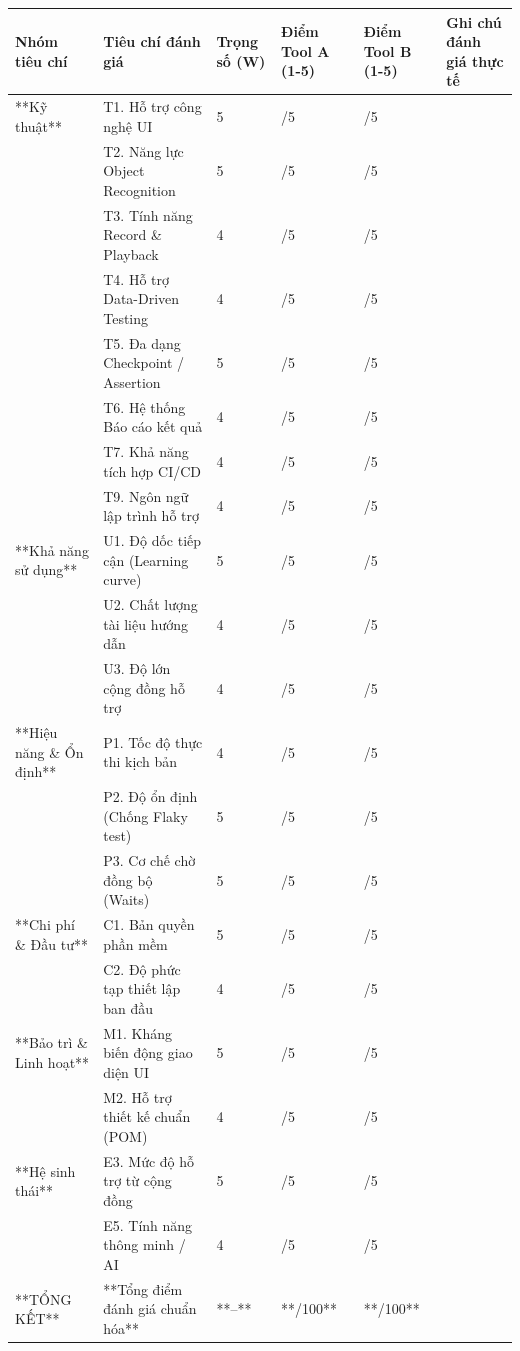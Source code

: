 \begin{table}[H]
\centering
\begin{tabular}{|l|l|l|l|l|l|}
\hline
\textbf{Nhóm tiêu chí} & \textbf{Tiêu chí đánh giá} & \textbf{Trọng số (W)} & \textbf{Điểm Tool A (1-5)} & \textbf{Điểm Tool B (1-5)} & \textbf{Ghi chú đánh giá thực tế} \\ \hline
**Kỹ thuật** & T1. Hỗ trợ công nghệ UI & 5 & /5 & /5 &  \\ \hline
 & T2. Năng lực Object Recognition & 5 & /5 & /5 &  \\ \hline
 & T3. Tính năng Record \& Playback & 4 & /5 & /5 &  \\ \hline
 & T4. Hỗ trợ Data-Driven Testing & 4 & /5 & /5 &  \\ \hline
 & T5. Đa dạng Checkpoint / Assertion & 5 & /5 & /5 &  \\ \hline
 & T6. Hệ thống Báo cáo kết quả & 4 & /5 & /5 &  \\ \hline
 & T7. Khả năng tích hợp CI/CD & 4 & /5 & /5 &  \\ \hline
 & T9. Ngôn ngữ lập trình hỗ trợ & 4 & /5 & /5 &  \\ \hline
**Khả năng sử dụng** & U1. Độ dốc tiếp cận (Learning curve) & 5 & /5 & /5 &  \\ \hline
 & U2. Chất lượng tài liệu hướng dẫn & 4 & /5 & /5 &  \\ \hline
 & U3. Độ lớn cộng đồng hỗ trợ & 4 & /5 & /5 &  \\ \hline
**Hiệu năng \& Ổn định** & P1. Tốc độ thực thi kịch bản & 4 & /5 & /5 &  \\ \hline
 & P2. Độ ổn định (Chống Flaky test) & 5 & /5 & /5 &  \\ \hline
 & P3. Cơ chế chờ đồng bộ (Waits) & 5 & /5 & /5 &  \\ \hline
**Chi phí \& Đầu tư** & C1. Bản quyền phần mềm & 5 & /5 & /5 &  \\ \hline
 & C2. Độ phức tạp thiết lập ban đầu & 4 & /5 & /5 &  \\ \hline
**Bảo trì \& Linh hoạt** & M1. Kháng biến động giao diện UI & 5 & /5 & /5 &  \\ \hline
 & M2. Hỗ trợ thiết kế chuẩn (POM) & 4 & /5 & /5 &  \\ \hline
**Hệ sinh thái** & E3. Mức độ hỗ trợ từ cộng đồng & 5 & /5 & /5 &  \\ \hline
 & E5. Tính năng thông minh / AI & 4 & /5 & /5 &  \\ \hline
**TỔNG KẾT** & **Tổng điểm đánh giá chuẩn hóa** & **--** & **/100** & **/100** &  \\ \hline
\end{tabular}
\end{table}





